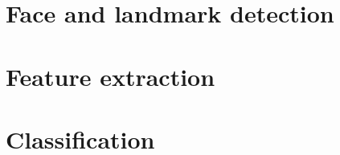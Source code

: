 \section{Face and landmark detection}
\label{spec:fd}

\section{Feature extraction}

\section{Classification}

